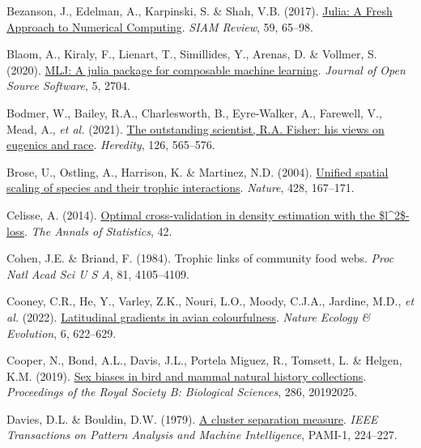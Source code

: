 \documentclass[
  letterpaper,
]{scrbook}
\newlength{\cslhangindent}
\newenvironment{CSLReferences}[2] %
 {\begin{list}{}{%
  \setlength{\itemindent}{0pt}
  \setlength{\leftmargin}{0pt}
  \setlength{\parsep}{0pt}
  \ifodd #1
   \setlength{\leftmargin}{\cslhangindent}
   \setlength{\itemindent}{-1\cslhangindent}
  \fi
  \setlength{\itemsep}{#2\baselineskip}}}
 {\end{list}}
\begin{document}
\begin{CSLReferences}{1}{0}
Bezanson, J., Edelman, A., Karpinski, S. \& Shah, V.B. (2017).
\href{https://doi.org/10.1137/141000671}{Julia: A Fresh Approach to
Numerical Computing}. \emph{SIAM Review}, 59, 65--98.

Blaom, A., Kiraly, F., Lienart, T., Simillides, Y., Arenas, D. \&
Vollmer, S. (2020). \href{https://doi.org/10.21105/joss.02704}{MLJ: A
julia package for composable machine learning}. \emph{Journal of Open
Source Software}, 5, 2704.

Bodmer, W., Bailey, R.A., Charlesworth, B., Eyre-Walker, A., Farewell,
V., Mead, A., \emph{et al.} (2021).
\href{https://doi.org/10.1038/s41437-020-00394-6}{The outstanding
scientist, R.A. Fisher: his views on eugenics and race}.
\emph{Heredity}, 126, 565--576.

Brose, U., Ostling, A., Harrison, K. \& Martinez, N.D. (2004).
\href{https://doi.org/10.1038/nature02297}{Unified spatial scaling of
species and their trophic interactions}. \emph{Nature}, 428, 167--171.

Celisse, A. (2014). \href{https://doi.org/10.1214/14-aos1240}{Optimal
cross-validation in density estimation with the
{\$}l{\^{}}{\textbraceleft}2{\textbraceright}{\$}-loss}. \emph{The
Annals of Statistics}, 42.

Cohen, J.E. \& Briand, F. (1984). Trophic links of community food webs.
\emph{Proc Natl Acad Sci U S A}, 81, 4105--4109.

Cooney, C.R., He, Y., Varley, Z.K., Nouri, L.O., Moody, C.J.A., Jardine,
M.D., \emph{et al.} (2022).
\href{https://doi.org/10.1038/s41559-022-01714-1}{Latitudinal gradients
in avian colourfulness}. \emph{Nature Ecology \& Evolution}, 6,
622--629.

Cooper, N., Bond, A.L., Davis, J.L., Portela Miguez, R., Tomsett, L. \&
Helgen, K.M. (2019). \href{https://doi.org/10.1098/rspb.2019.2025}{Sex
biases in bird and mammal natural history collections}.
\emph{Proceedings of the Royal Society B: Biological Sciences}, 286,
20192025.

Davies, D.L. \& Bouldin, D.W. (1979).
\href{https://doi.org/10.1109/tpami.1979.4766909}{A cluster separation
measure}. \emph{IEEE Transactions on Pattern Analysis and Machine
Intelligence}, PAMI-1, 224--227.


\end{CSLReferences}
\end{document}
